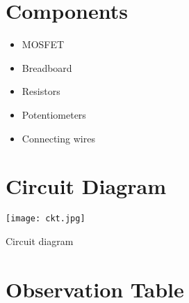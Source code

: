 \documentclass[12pt]{article}
\begin{document}
\section*{Components}
\begin{itemize}
    \item MOSFET
    \item Breadboard
    \item Resistors 
    \item Potentiometers
    \item Connecting wires
\end{itemize}

\section*{Circuit Diagram}
\texttt{[image: ckt.jpg]}
  \caption{Circuit diagram}
  

\section*{Observation Table}
\end{document}
